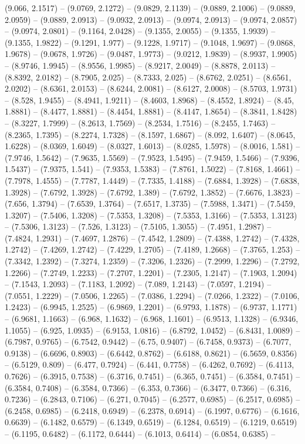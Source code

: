 (9.066, 2.1517) -- (9.0769, 2.1272) -- (9.0829, 2.1139) -- (9.0889, 2.1006) -- (9.0889, 2.0959) -- (9.0889, 2.0913) -- (9.0932, 2.0913) -- (9.0974, 2.0913) -- (9.0974, 2.0857) -- (9.0974, 2.0801) -- (9.1164, 2.0428) -- (9.1355, 2.0055) -- (9.1355, 1.9939) -- (9.1355, 1.9822) -- (9.1291, 1.977) -- (9.1228, 1.9717) -- (9.1048, 1.9697) -- (9.0868, 1.9678) -- (9.0678, 1.9726) -- (9.0487, 1.9773) -- (9.0212, 1.9839) -- (8.9937, 1.9905) -- (8.9746, 1.9945) -- (8.9556, 1.9985) -- (8.9217, 2.0049) -- (8.8878, 2.0113) -- (8.8392, 2.0182) -- (8.7905, 2.025) -- (8.7333, 2.025) -- (8.6762, 2.0251) -- (8.6561, 2.0202) -- (8.6361, 2.0153) -- (8.6244, 2.0081) -- (8.6127, 2.0008) -- (8.5703, 1.9731) -- (8.528, 1.9455) -- (8.4941, 1.9211) -- (8.4603, 1.8968) -- (8.4552, 1.8924) -- (8.45, 1.8881) -- (8.4477, 1.8881) -- (8.4454, 1.8881) -- (8.4147, 1.8654) -- (8.3841, 1.8428) -- (8.3227, 1.7999) -- (8.2613, 1.7569) -- (8.2534, 1.7516) -- (8.2455, 1.7463) -- (8.2365, 1.7395) -- (8.2274, 1.7328) -- (8.1597, 1.6867) -- (8.092, 1.6407) -- (8.0645, 1.6228) -- (8.0369, 1.6049) -- (8.0327, 1.6013) -- (8.0285, 1.5978) -- (8.0016, 1.581) -- (7.9746, 1.5642) -- (7.9635, 1.5569) -- (7.9523, 1.5495) -- (7.9459, 1.5466) -- (7.9396, 1.5437) -- (7.9375, 1.541) -- (7.9353, 1.5383) -- (7.8761, 1.5022) -- (7.8168, 1.4661) -- (7.7978, 1.4555) -- (7.7787, 1.4449) -- (7.7335, 1.4188) -- (7.6884, 1.3928) -- (7.6838, 1.3928) -- (7.6792, 1.3928) -- (7.6792, 1.389) -- (7.6792, 1.3852) -- (7.6676, 1.3823) -- (7.656, 1.3794) -- (7.6539, 1.3764) -- (7.6517, 1.3735) -- (7.5988, 1.3471) -- (7.5459, 1.3207) -- (7.5406, 1.3208) -- (7.5353, 1.3208) -- (7.5353, 1.3166) -- (7.5353, 1.3123) -- (7.5306, 1.3123) -- (7.526, 1.3123) -- (7.5105, 1.3055) -- (7.4951, 1.2987) -- (7.4824, 1.2931) -- (7.4697, 1.2876) -- (7.4542, 1.2809) -- (7.4388, 1.2742) -- (7.4328, 1.2742) -- (7.4269, 1.2742) -- (7.4229, 1.2705) -- (7.4189, 1.2668) -- (7.3765, 1.253) -- (7.3342, 1.2392) -- (7.3274, 1.2359) -- (7.3206, 1.2326) -- (7.2999, 1.2296) -- (7.2792, 1.2266) -- (7.2749, 1.2233) -- (7.2707, 1.2201) -- (7.2305, 1.2147) -- (7.1903, 1.2094) -- (7.1543, 1.2093) -- (7.1183, 1.2092) -- (7.089, 1.2143) -- (7.0597, 1.2194) -- (7.0551, 1.2229) -- (7.0506, 1.2265) -- (7.0386, 1.2294) -- (7.0266, 1.2322) -- (7.0106, 1.2423) -- (6.9945, 1.2525) -- (6.9869, 1.2201) -- (6.9793, 1.1878) -- (6.9737, 1.1771) -- (6.9681, 1.1663) -- (6.968, 1.1632) -- (6.968, 1.1601) -- (6.9513, 1.1328) -- (6.9346, 1.1055) -- (6.925, 1.0935) -- (6.9153, 1.0816) -- (6.8792, 1.0452) -- (6.8431, 1.0089) -- (6.7987, 0.9765) -- (6.7542, 0.9442) -- (6.75, 0.9407) -- (6.7458, 0.9373) -- (6.7077, 0.9138) -- (6.6696, 0.8903) -- (6.6442, 0.8762) -- (6.6188, 0.8621) -- (6.5659, 0.8356) -- (6.5129, 0.809) -- (6.477, 0.7924) -- (6.441, 0.7758) -- (6.4262, 0.7692) -- (6.4113, 0.7626) -- (6.3915, 0.7538) -- (6.3716, 0.7451) -- (6.365, 0.7451) -- (6.3584, 0.7451) -- (6.3584, 0.7408) -- (6.3584, 0.7366) -- (6.353, 0.7366) -- (6.3477, 0.7366) -- (6.316, 0.7236) -- (6.2843, 0.7106) -- (6.271, 0.7045) -- (6.2577, 0.6985) -- (6.2517, 0.6985) -- (6.2458, 0.6985) -- (6.2418, 0.6949) -- (6.2378, 0.6914) -- (6.1997, 0.6776) -- (6.1616, 0.6639) -- (6.1482, 0.6579) -- (6.1349, 0.6519) -- (6.1284, 0.6519) -- (6.1219, 0.6519) -- (6.1195, 0.6482) -- (6.1172, 0.6444) -- (6.1013, 0.6414) -- (6.0854, 0.6385) -- 